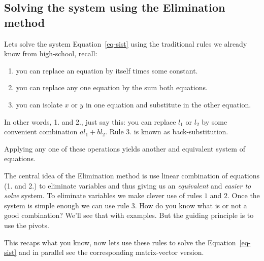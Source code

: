 \documentclass[
  letterpaper,
  DIV=11,
  numbers=noendperiod]{scrartcl}
\providecommand{\tightlist}{%
  \setlength{\itemsep}{0pt}\setlength{\parskip}{0pt}}\usepackage{longtable,booktabs,array}
\theoremstyle{definition}
\theoremstyle{remark}
\begin{document}
\subsection{Solving the system using the Elimination
method}\label{solving-the-system-using-the-elimination-method}

Lets solve the system Equation~\ref{eq-sist} using the traditional rules
we already know from high-school, recall:

\begin{enumerate}
\def\labelenumi{\arabic{enumi}.}
\tightlist
\item
  you can replace an equation by itself times some constant.
\item
  you can replace any one equation by the sum both equations.
\item
  you can isolate \(x\) or \(y\) in one equation and substitute in the
  other equation.
\end{enumerate}

In other words, 1. and 2., just say this: you can replace \(l_1\) or
\(l_2\) by some convenient combination \(al_1+bl_2\). Rule 3. is known
as back-substitution.

Applying any one of these operations yields another and equivalent
system of equations.

The central idea of the Elimination method is use linear combination of
equations (1. and 2.) to eliminate variables and thus giving us an
\emph{equivalent} and \emph{easier to solve} system. To eliminate
variables we make clever use of rules \(1\) and \(2\). Once the system
is simple enough we can use rule \(3\). How do you know what is or not a
good combination? We'll see that with examples. But the guiding
principle is to use the pivots.

This recaps what you know, now lets use these rules to solve the
Equation~\ref{eq-sist} and in parallel see the corresponding
matrix-vector version.
\end{document}

